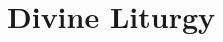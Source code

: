 \documentclass[twoside]{article}
\date{}
\begin{document}
\begin{comment}
\title{Divine Liturgy Hymnal}
\maketitle
\clearpage
\end{comment}


\begin{comment}
БОЖЕСТВЕННАЯ ЛИТУРГИЯ
ИЖЕ ВО СВЯТЫХ ОТЦА НАШЕГО
ИОАННА ЗЛАТОУСТАГО.
Времени же наставшу, входит священник во храм и соединився со диаконом, творят вкупе к востоку пред святыми дверьми поклонения три и молитвы. Вшедше же во святилище облачатся и творят проскомидию. По отпусте же проскомидии кадит диакон святое предложение, святилище и храм весь, входит паки во святый олтарь, и покадив святую трапезу паки, и священника, кадильницу убо отлагает на место свое, сам же приходит ко иерею. И ставше вкупе пред святою трапезою, покланяются трижды, в себе молящеся и глаголюще:
Цар\'{ю} Неб\'{е}сный, Ут\'{е}шителю, Д\'{у}ше \'{и}стины, И́же везд\'{е} сый и вся исполн\'{я}яй, Сокр\'{о}вище благ\'{и}х и ж\'{и}зни Под\'{а}телю, приид\'{и} и всел\'{и}ся в ны, и оч\'{и}сти ны от вс\'{я}кия скв\'{е}рны, и спас\'{и}, Бл\'{а}же, д\'{у}ши н\'{а}ша.
Сл\'{а}ва в В\'{ы}шних Б\'{о}гу, и на земл\'{и} мир, в челов\'{е}цех благовол\'{е}ние. Дважды.
Г\'{о}споди, устн\'{е} мо\'{и} отв\'{е}рзеши, и уст\'{а} мо\'{я} возвест\'{я}т хвал\'{у} Тво\'{ю}.
Таже целуют, священник убо святое Евангелие, диакон же святую трапезу. И посем подклонив диакон свою главу священнику, держа и орарь треми персты десныя руки, глаголет:
Вр\'{е}мя сотвор\'{и}ти Г\'{о}сподеви, влад\'{ы}ко, благослов\'{и}.
Священник, знаменуя его, глаголет: Благослов\'{е}н Бог наш всегд\'{а}, н\'{ы}не и пр\'{и}сно и во в\'{е}ки век\'{о}в.
Таже диакон: Помол\'{и}ся о мн\'{е}, влад\'{ы}ко свят\'{ы}й.
Священник: Да испр\'{а}вит Госп\'{о}дь стоп\'{ы} Тво\'{я}.
И паки диакон: Помян\'{и} мя, влад\'{ы}ко свят\'{ы}й.
Священник: Да помян\'{е}т тя Госп\'{о}дь Бог во Ц\'{а}рствии Сво\'{е}м всегд\'{а}, н\'{ы}не и пр\'{и}сно и во в\'{е}ки век\'{о}в.
Диакон же: Ам\'{и}нь.
И поклонився исходит северными дверьми, понеже царския двери до входа не отверзаются. И став на обычном месте, прямо святых дверей, покланяется со благоговением, трижды, глаголя в себе:
Г\'{о}споди, устн\'{е} мо\'{и} отв\'{е}рзеши, и уст\'{а} моя возвест\'{я}т хвал\'{у} Тво\'{ю}.
\end{comment}

\section{Divine Liturgy}
\end{document}
